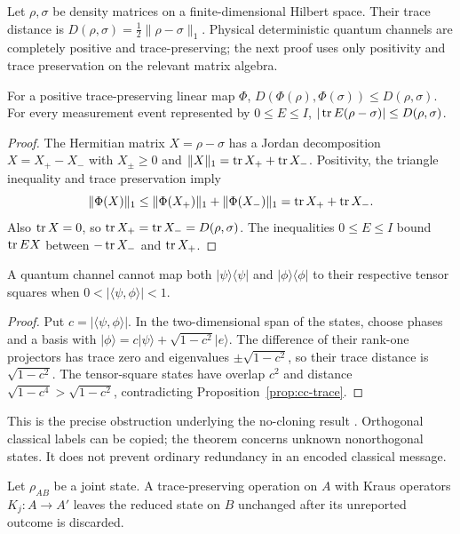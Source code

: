 Let $\rho,\sigma$ be density matrices on a finite-dimensional Hilbert
space. Their trace distance is
$D(\rho,\sigma)=\frac12\|\rho-\sigma\|_1$. Physical deterministic
quantum channels are completely positive and trace-preserving; the next
proof uses only positivity and trace preservation on the relevant
matrix algebra.

\begin{proposition}
\label{prop:cc-trace}
For a positive trace-preserving linear map $\Phi$,
$D(\Phi(\rho),\Phi(\sigma))\le D(\rho,\sigma)$. For every measurement
event represented by $0\le E\le I$,
$|\operatorname{tr} E(\rho-\sigma)|\le D(\rho,\sigma)$.
\end{proposition}

\begin{proof}
The Hermitian matrix $X=\rho-\sigma$ has a Jordan decomposition
$X=X_+-X_-$ with $X_\pm\ge0$ and
$\|X\|_1=\operatorname{tr} X_++\operatorname{tr} X_-$. Positivity, the triangle inequality and
trace preservation imply
\[
 \|\Phi(X)\|_1\le\|\Phi(X_+)\|_1+\|\Phi(X_-)\|_1
 =\operatorname{tr} X_++\operatorname{tr} X_-.
\]
Also $\operatorname{tr} X=0$, so $\operatorname{tr} X_+=\operatorname{tr} X_-=D(\rho,\sigma)$.
The inequalities $0\le E\le I$ bound $\operatorname{tr} EX$ between
$-\operatorname{tr} X_-$ and $\operatorname{tr} X_+$.
\end{proof}

\begin{corollary}
\label{cor:cc-cloning}
A quantum channel cannot map both
$|\psi\rangle\langle\psi|$ and $|\phi\rangle\langle\phi|$ to their
respective tensor squares when
$0<|\langle\psi,\phi\rangle|<1$.
\end{corollary}

\begin{proof}
Put $c=|\langle\psi,\phi\rangle|$. In the two-dimensional span of the
states, choose phases and a basis with
$|\phi\rangle=c|\psi\rangle+\sqrt{1-c^2}|e\rangle$.
The difference of their rank-one projectors has trace zero and eigenvalues
$\pm\sqrt{1-c^2}$, so their trace distance is $\sqrt{1-c^2}$.
The tensor-square states have overlap $c^2$ and distance
$\sqrt{1-c^4}>\sqrt{1-c^2}$, contradicting
Proposition~\ref{prop:cc-trace}.
\end{proof}

This is the precise obstruction underlying the no-cloning result
\citep{CCWoottersZurek1982}. Orthogonal classical labels can be copied;
the theorem concerns unknown nonorthogonal states. It does not prevent
ordinary redundancy in an encoded classical message.

\begin{proposition}
\label{prop:cc-nosignalling}
Let $\rho_{AB}$ be a joint state. A trace-preserving operation on $A$
with Kraus operators $K_j:A\to A'$ leaves the reduced state on $B$
unchanged after its unreported outcome is discarded.
\end{proposition}

